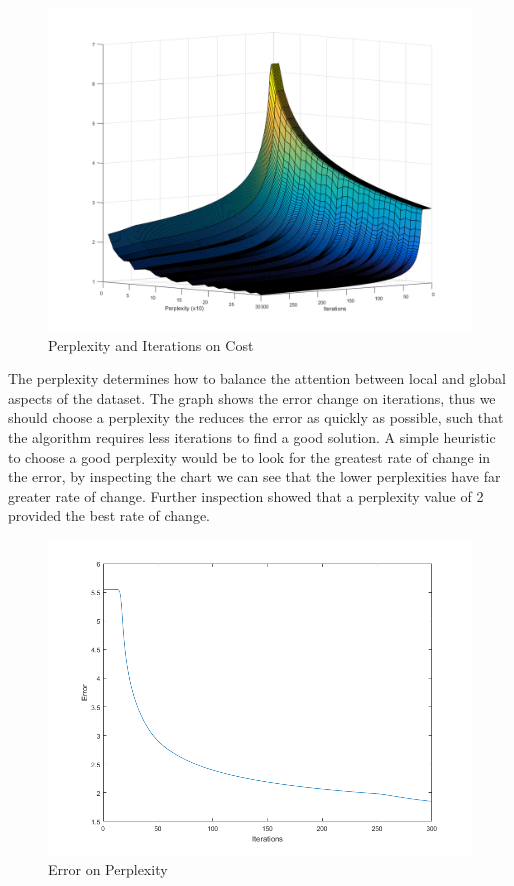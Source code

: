 \begin{figure}[H]
    \includegraphics[width=\linewidth]{../../pracs/week6/images/q8}
    \centering
    \caption{Perplexity and Iterations on Cost}
\end{figure}

The perplexity determines how to balance the attention between local and global aspects of the dataset.
The graph shows the error change on iterations, thus we should choose a perplexity the reduces the error as quickly as possible, such that the algorithm requires less iterations to find a good solution.
A simple heuristic to choose a good perplexity would be to look for the greatest rate of change in the error, by inspecting the chart we can see that the lower perplexities have far greater rate of change.
Further inspection showed that a perplexity value of 2 provided the best rate of change.

\begin{figure}[H]
    \includegraphics[width=\linewidth]{../../pracs/week6/images/q8_p2}
    \centering
    \caption{Error on Perplexity}
\end{figure}


